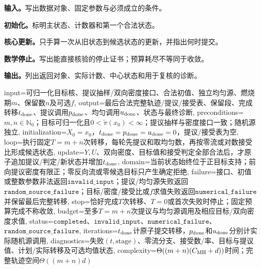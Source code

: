 \begin{keypointbox}[title={带零流分支和完整状态轨迹的一般MH：五步阅读}]
\textbf{输入。}写出数据对象、固定参数与必须成立的条件。\par
\textbf{初始化。}标明主状态、计数器和第一个合法状态。\par
\textbf{核心更新。}只手算一次从旧状态到候选状态的更新，并指出何时提交。\par
\textbf{数学停止。}写出能直接核验的停止证书；预算耗尽不等同于收敛。\par
\textbf{输出。}列出返回对象、实际计数、中心状态和用于复核的诊断。
\end{keypointbox}

\begin{AlgorithmContract}{
  input={可归一化目标核、提议抽样/双向密度接口、合法初值、独立均匀源、燃烧期$m$、保留数$n$及可选$f$},
  output={最后合法完整轨迹/提议/接受表、保留段、完成转移$t_{\rm done}$、提议调用$p_{\rm done}$、均匀调用$u_{\rm done}$、状态与最终诊断},
  preconditions={$m,n\in\mathbb N_0$；目标可归一化且$0<\widetilde\pi(x_0)<\infty$；提议抽样与密度接口一致；随机源独立},
  initialization={$X_0=x_0$，$t_{\rm done}=p_{\rm done}=u_{\rm done}=0$，提议/接受表为空},
  loop={执行固定$T=m+n$次转移，每轮先提议和取均匀数，再按零流或对数接受比形成候选状态},
  update={$Y,U$、双向密度、目标值和接受判定全部合法后，才原子追加提议/判定/新状态并增加$t_{\rm done}$},
  domain={当前状态始终位于正目标支持；前向提议密度有限正；零反向流或零候选目标只产生确定拒绝},
  failure={接口、初值或整数参数非法返回$\mathtt{invalid\_input}$；提议/均匀源失败返回$\mathtt{random\_source\_failure}$；目标/密度/接受比或$f$求值失败返回$\mathtt{numerical\_failure}$并保留最后完整转移},
  stop={恰好完成$T$次转移、$T=0$或首次失败时停止；固定预算完成不称收敛},
  budget={至多$T=m+n$次提议与均匀源调用及相应目标/双向密度求值},
  status={$\mathtt{completed}$、$\mathtt{invalid\_input}$、$\mathtt{numerical\_failure}$、$\mathtt{random\_source\_failure}$},
  iterations={$t_{\rm done}$计原子提交转移，$p_{\rm done}$和$u_{\rm done}$分别计实际随机源调用},
  diagnostics={失败$(t,\mathrm{stage})$、零流分支、接受数/率、目标与提议值、计划/实际转移及可选均值状态},
  complexity={$\Theta((m+n)(C_{\rm MH}+d))$时间；完整轨迹空间$\Theta((m+n)d)$}
}
\begin{algorithm}[tbp]
\caption{带零流分支和完整状态轨迹的一般MH}\label{alg:V5-C03-general-mh}

\end{algorithm}
\end{AlgorithmContract}
